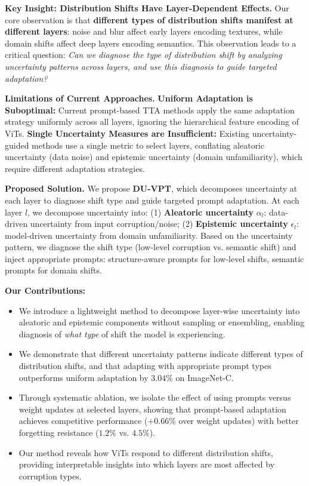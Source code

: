 \documentclass[11pt,a4paper]{article}
\begin{document}
\textbf{Key Insight: Distribution Shifts Have Layer-Dependent Effects.} Our core observation is that \textbf{different types of distribution shifts manifest at different layers}: noise and blur affect early layers encoding textures, while domain shifts affect deep layers encoding semantics. This observation leads to a critical question: \textit{Can we diagnose the type of distribution shift by analyzing uncertainty patterns across layers, and use this diagnosis to guide targeted adaptation?}

\textbf{Limitations of Current Approaches.} \textbf{Uniform Adaptation is Suboptimal:} Current prompt-based TTA methods apply the same adaptation strategy uniformly across all layers, ignoring the hierarchical feature encoding of ViTs. \textbf{Single Uncertainty Measures are Insufficient:} Existing uncertainty-guided methods use a single metric to select layers, conflating aleatoric uncertainty (data noise) and epistemic uncertainty (domain unfamiliarity), which require different adaptation strategies.

\textbf{Proposed Solution.} We propose \textbf{DU-VPT}, which decomposes uncertainty at each layer to diagnose shift type and guide targeted prompt adaptation. At each layer $l$, we decompose uncertainty into: (1) \textbf{Aleatoric uncertainty} $\alpha_l$: data-driven uncertainty from input corruption/noise; (2) \textbf{Epistemic uncertainty} $\epsilon_l$: model-driven uncertainty from domain unfamiliarity. Based on the uncertainty pattern, we diagnose the shift type (low-level corruption vs. semantic shift) and inject appropriate prompts: structure-aware prompts for low-level shifts, semantic prompts for domain shifts.

\textbf{Our Contributions:}
\begin{itemize}
    \item We introduce a lightweight method to decompose layer-wise uncertainty into aleatoric and epistemic components without sampling or ensembling, enabling diagnosis of \textit{what type} of shift the model is experiencing.
    \item We demonstrate that different uncertainty patterns indicate different types of distribution shifts, and that adapting with appropriate prompt types outperforms uniform adaptation by $3.04\%$ on ImageNet-C.
    \item Through systematic ablation, we isolate the effect of using prompts versus weight updates at selected layers, showing that prompt-based adaptation achieves competitive performance ($+0.66\%$ over weight updates) with better forgetting resistance ($1.2\%$ vs. $4.5\%$).
    \item Our method reveals how ViTs respond to different distribution shifts, providing interpretable insights into which layers are most affected by corruption types.
\end{itemize}
\end{document}
